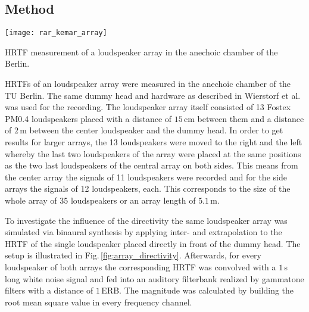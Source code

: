 \subsection{Method}
%
\begin{marginfigure}
    \texttt{[image: rar\_kemar\_array]}
    \caption{\ac{HRTF} measurement of a loudspeaker array in the anechoic
    chamber of the  Berlin.
    }
    \label{fig:HRTF_measurement_array}
\end{marginfigure}
%
\acp{HRTF} of an loudspeaker array were measured in the anechoic chamber of
the {\small TU}
Berlin. The same dummy head and hardware as described in Wierstorf et
al.\autocite{Wierstorf2011a} was used for the recording. The loudspeaker array
itself consisted of 13 Fostex {\small PM0.4} loudspeakers placed with a distance of
$15$\,cm between them and a distance of $2$\,m between the center loudspeaker
and the dummy head. In order to get results for larger arrays, the 13
loudspeakers were moved to the right and the left whereby the last two
loudspeakers of the array were placed at the same positions as the
two last loudspeakers of the central array on both sides. This means from the center
array the signals of 11 loudspeakers were recorded and for the side arrays the
signals of 12 loudspeakers, each. This corresponds to the size
of the whole array of 35 loudspeakers or an array length of $5.1$\,m.

To investigate the influence of the directivity the same loudspeaker array was
simulated via binaural synthesis by applying inter- and extrapolation to the \ac{HRTF} of the
single loudspeaker placed directly in front of the dummy head. The setup is
illustrated in Fig.\,\ref{fig:array_directivity}. Afterwards, for every
loudspeaker of both arrays the corresponding \ac{HRTF} was convolved with a $1$\,s
long white noise signal and fed into an auditory filterbank realized by
gammatone filters with a distance of $1$\,ERB. The magnitude was calculated by
building the root mean square value in every frequency channel.

